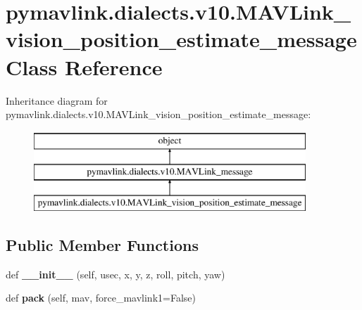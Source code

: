 \hypertarget{classpymavlink_1_1dialects_1_1v10_1_1MAVLink__vision__position__estimate__message}{}\section{pymavlink.\+dialects.\+v10.\+M\+A\+V\+Link\+\_\+vision\+\_\+position\+\_\+estimate\+\_\+message Class Reference}
\label{classpymavlink_1_1dialects_1_1v10_1_1MAVLink__vision__position__estimate__message}
Inheritance diagram for pymavlink.\+dialects.\+v10.\+M\+A\+V\+Link\+\_\+vision\+\_\+position\+\_\+estimate\+\_\+message\+:\begin{figure}[H]
\begin{center}
\leavevmode
\includegraphics[height=3.000000cm]{classpymavlink_1_1dialects_1_1v10_1_1MAVLink__vision__position__estimate__message}
\end{center}
\end{figure}
\subsection*{Public Member Functions}
\begin{DoxyCompactItemize}
\item 
\mbox{\label{classpymavlink_1_1dialects_1_1v10_1_1MAVLink__vision__position__estimate__message_a8d8bab9665d74dad9643543dc9ee0b73}} 
def {\bfseries \+\_\+\+\_\+init\+\_\+\+\_\+} (self, usec, x, y, z, roll, pitch, yaw)
\item 
\mbox{\label{classpymavlink_1_1dialects_1_1v10_1_1MAVLink__vision__position__estimate__message_a8b5166285dc11086209a8f6ce32af57a}} 
def {\bfseries pack} (self, mav, force\+\_\+mavlink1=False)
\end{DoxyCompactItemize}
